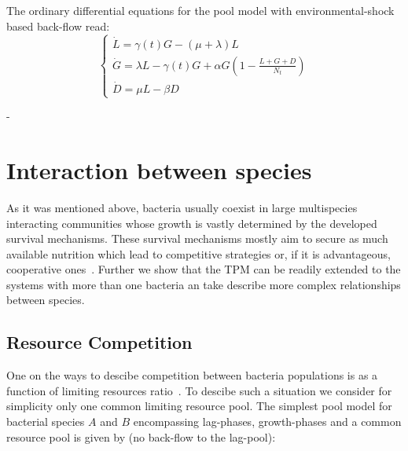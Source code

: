 \documentclass[10pt,A4paper]{article}
\begin{document}
The ordinary differential equations for the pool model with environmental-shock based back-flow read:
\begin{equation}
    \begin{cases}
    \dot{L} =\gamma(t) G - (\mu + \lambda) L\\
    \dot{G} = \lambda L -\gamma(t) G + \alpha G\left(1-\frac{L+G+D}{N_t}\right)\\
    \dot{D} = \mu  L - \beta D
    \end{cases}
\end{equation}

-  


\newpage

\section{Interaction between species}

As it was mentioned above, bacteria usually coexist in large multispecies interacting communities whose growth is vastly determined by the developed survival mechanisms.
These survival mechanisms mostly aim to secure as much available nutrition which lead to competitive strategies or, if it is advantageous, cooperative ones~\cite{hibbing_bacterial_2010, stubbendieck_bacterial_2016}.
Further we show that the TPM can be readily extended to the systems with more than one bacteria an take describe more complex relationships between species. 


\subsection{Resource Competition}

One on the ways to descibe competition between bacteria populations is as a function of limiting resources ratio~\cite{tilman_resource_1977, smith_effects_2002}.
To descibe such a situation we consider for simplicity only one common limiting resource pool. 
The simplest pool model for bacterial species $A$ and $B$ encompassing lag-phases, growth-phases and a common resource pool is given by (no back-flow to the lag-pool):
\end{document}
